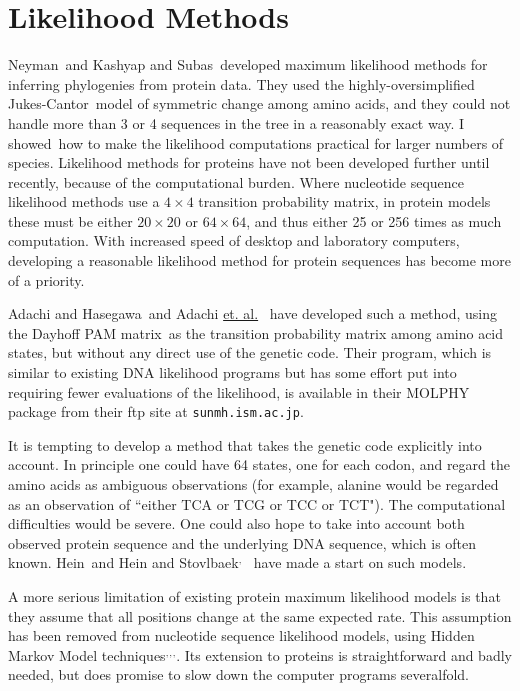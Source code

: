 \documentclass[12pt]{article}
\def\ul{\underline}
\def\fn{\footnotemark\ }
\begin{document}
\section*{Likelihood Methods}

Neyman\footnotemark[3]\ and Kashyap and Subas\fn developed maximum likelihood
methods for inferring phylogenies from protein data.  They used the
highly-oversimplified Jukes-Cantor\footnotemark[10]\ model of symmetric change among amino
acids, and they could not handle more than 3 or 4 sequences in the tree
in a reasonably exact way.  I showed\fn how to make the
likelihood computations practical for larger numbers of species.
Likelihood methods for proteins have not been developed further until
recently, because of the computational burden.  Where nucleotide sequence
likelihood methods use a $4 \times 4$ transition probability matrix,
in protein models these must be either $20 \times 20$ or $64 \times 64$,
and thus either 25 or 256 times as much computation.  With increased
speed of desktop and laboratory computers, developing a reasonable
likelihood method for protein sequences has become more of a priority.

Adachi and Hasegawa\fn and Adachi \ul{et. al.}\fn
have developed such a method, using the
Dayhoff PAM matrix\footnotemark[13]\ as the transition probability matrix among
amino acid states, but without any direct use of the genetic code.
Their program, which is similar to existing DNA likelihood programs
but has some effort put into requiring fewer evaluations of the likelihood,
is available in their MOLPHY package from their ftp site at {\tt sunmh.ism.ac.jp}.

It is tempting to develop a method that takes the genetic code
explicitly into account.  In principle one could have 64 states, one
for each codon, and regard the amino acids as ambiguous observations
(for example, alanine would be regarded as an observation of
``either TCA or TCG or TCC or TCT").
The computational difficulties would be severe.  One could also
hope to take into account both observed protein sequence and the
underlying DNA sequence, which is often known.  Hein\fn and Hein and Stovlbaek\footnotemark$^,$\fn
have made a start on such models.

A more serious limitation of existing protein maximum likelihood
models is that they assume that all positions change at the same
expected rate.  This assumption has been removed from nucleotide
sequence likelihood models, using Hidden Markov Model techniques\footnotemark$^,$\footnotemark$^,$\footnotemark$^,$\footnotemark. Its
extension to proteins is straightforward and badly needed, but
does promise to slow down the computer programs severalfold.
\end{document}
